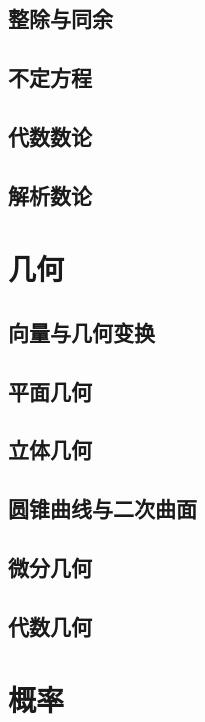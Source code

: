 \documentclass{book}
\begin{document}
\chapter{整除与同余}

\chapter{不定方程}

\chapter{代数数论}

\chapter{解析数论}

\part{几何}
\chapter{向量与几何变换}

\chapter{平面几何}


\chapter{立体几何}


\chapter{圆锥曲线与二次曲面}

\chapter{微分几何}

\chapter{代数几何}

\part{概率}
\end{document}
